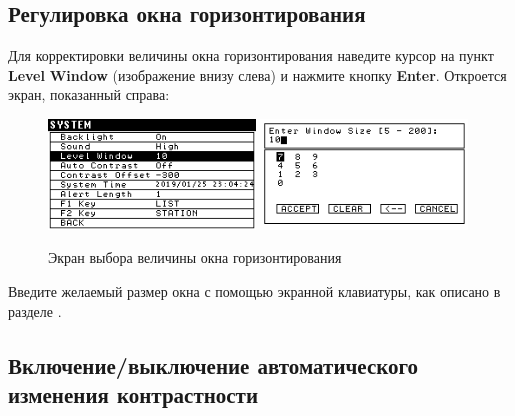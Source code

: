 \subsection{Регулировка окна горизонтирования}
\label{subsec:adjusting_the_level_window}


Для корректировки величины окна горизонтирования наведите курсор на пункт
\textbf{Level} \textbf{Window} (изображение внизу слева) и нажмите кнопку
\textbf{Enter}. Откроется экран, показанный справа:

\begin{figure}[H]
  \centering
  \includegraphics[width=0.49\textwidth]{figures/the_level_window_size_editing_screen_1}
  \includegraphics[width=0.49\textwidth]{figures/the_level_window_size_editing_screen_2}
  \caption{Экран выбора величины окна горизонтирования}
  \label{fig:the_level_window_size_editing_screen}
\end{figure}

Введите желаемый размер окна с помощью экранной клавиатуры, как описано в
разделе .

\subsection{Включение/выключение автоматического изменения контрастности}


